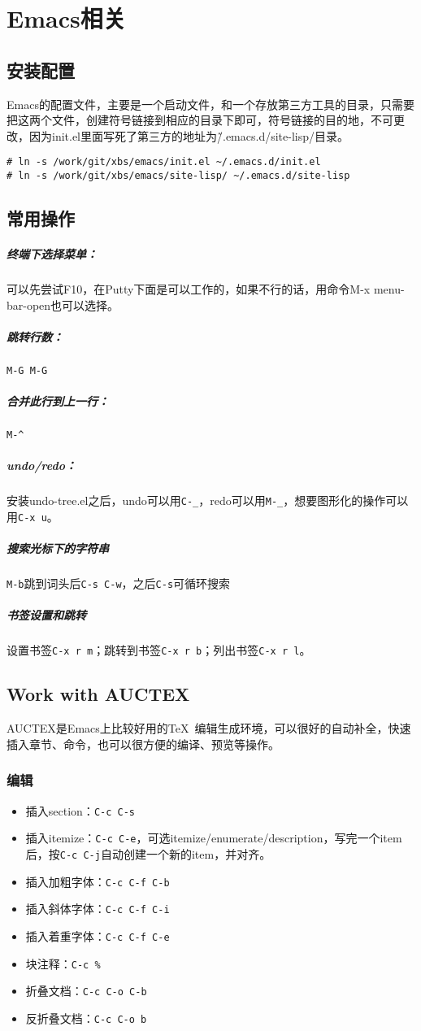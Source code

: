 \section{Emacs相关}
\subsection{安装配置}
Emacs的配置文件，主要是一个启动文件，和一个存放第三方工具的目录，只需要把这两个文件，创建符号链接到相应的目录下即可，符号链接的目的地，不可更改，因为init.el里面写死了第三方的地址为\~/.emacs.d/site-lisp/目录。
\begin{lstlisting}[numbers=none]
# ln -s /work/git/xbs/emacs/init.el ~/.emacs.d/init.el
# ln -s /work/git/xbs/emacs/site-lisp/ ~/.emacs.d/site-lisp
\end{lstlisting}

\subsection{常用操作}

\subparagraph{终端下选择菜单：}
可以先尝试F10，在Putty下面是可以工作的，如果不行的话，用命令M-x menu-bar-open也可以选择。
\subparagraph{跳转行数：}
\verb|M-G M-G|
\subparagraph{合并此行到上一行：}
\verb|M-^|
\subparagraph{undo/redo：}
安装undo-tree.el之后，undo可以用\verb|C-_|，redo可以用\verb|M-_|，想要图形化的操作可以用\verb|C-x u|。
\subparagraph{搜索光标下的字符串}
\verb|M-b|跳到词头后\verb|C-s C-w|，之后\verb|C-s|可循环搜索
\subparagraph{书签设置和跳转}
设置书签\verb|C-x r m|；跳转到书签\verb|C-x r b|；列出书签\verb|C-x r l|。

\subsection{Work with AUCTEX}
\label{sec:work-with-auctex}
AUCTEX是Emacs上比较好用的\TeX~编辑生成环境，可以很好的自动补全，快速插入章节、命令，也可以很方便的编译、预览等操作。
\subsubsection{编辑}
\label{sec:auctex-edit}
\begin{itemize}
\item 插入section：\verb|C-c C-s|
\item 插入itemize：\verb|C-c C-e|，可选itemize/enumerate/description，写完一个item后，按\verb|C-c C-j|自动创建一个新的item，并对齐。
\item 插入加粗字体：\verb|C-c C-f C-b|
\item 插入斜体字体：\verb|C-c C-f C-i|
\item 插入着重字体：\verb|C-c C-f C-e|
\item 块注释：\verb|C-c %|
\item 折叠文档：\verb|C-c C-o C-b|
\item 反折叠文档：\verb|C-c C-o b|
\end{itemize}

